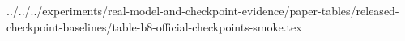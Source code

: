 ../../../experiments/real-model-and-checkpoint-evidence/paper-tables/released-checkpoint-baselines/table-b8-official-checkpoints-smoke.tex